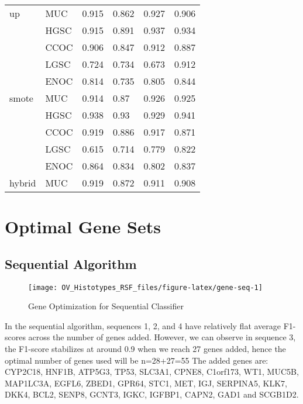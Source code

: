 \documentclass[
]{report}
\begin{document}
\begin{table}
\begin{tabular}[t]{l|l|l|l|l|l}
\cline{2-6}
\multirow{-5}{*}{\raggedright\arraybackslash up} & MUC & 0.915 & 0.862 & 0.927 & 0.906\\
\cline{1-6}
 & HGSC & 0.915 & 0.891 & 0.937 & 0.934\\
\cline{2-6}
 & CCOC & 0.906 & 0.847 & 0.912 & 0.887\\
\cline{2-6}
 & LGSC & 0.724 & 0.734 & 0.673 & 0.912\\
\cline{2-6}
 & ENOC & 0.814 & 0.735 & 0.805 & 0.844\\
\cline{2-6}
\multirow{-5}{*}{\raggedright\arraybackslash smote} & MUC & 0.914 & 0.87 & 0.926 & 0.925\\
\cline{1-6}
 & HGSC & 0.938 & 0.93 & 0.929 & 0.941\\
\cline{2-6}
 & CCOC & 0.919 & 0.886 & 0.917 & 0.871\\
\cline{2-6}
 & LGSC & 0.615 & 0.714 & 0.779 & 0.822\\
\cline{2-6}
 & ENOC & 0.864 & 0.834 & 0.802 & 0.837\\
\cline{2-6}
\multirow{-5}{*}{\raggedright\arraybackslash hybrid} & MUC & 0.919 & 0.872 & 0.911 & 0.908\\
\hline
\end{tabular}
\end{table}

\hypertarget{optimal-gene-sets}{%
\section{Optimal Gene Sets}\label{optimal-gene-sets}}

\hypertarget{sequential-algorithm-1}{%
\subsection{Sequential Algorithm}\label{sequential-algorithm-1}}

\begin{figure}[H]

{\centering \texttt{[image: OV\_Histotypes\_RSF\_files/figure-latex/gene-seq-1]} 

}

\caption{Gene Optimization for Sequential Classifier}\label{fig:gene-seq}
\end{figure}

In the sequential algorithm, sequences 1, 2, and 4 have relatively flat average F1-scores across the number of genes added. However, we can observe in sequence 3, the F1-score stabilizes at around 0.9 when we reach 27 genes added, hence the optimal number of genes used will be n=28+27=55 The added genes are: CYP2C18, HNF1B, ATP5G3, TP53, SLC3A1, CPNE8, C1orf173, WT1, MUC5B, MAP1LC3A, EGFL6, ZBED1, GPR64, STC1, MET, IGJ, SERPINA5, KLK7, DKK4, BCL2, SENP8, GCNT3, IGKC, IGFBP1, CAPN2, GAD1 and SCGB1D2.
\end{document}
